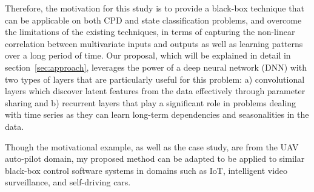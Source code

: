 Therefore, the motivation for this study is to provide a black-box technique that can be applicable on both CPD and state classification problems, and overcome the limitations of the existing techniques, in terms of capturing the non-linear correlation between multivariate inputs and outputs as well as learning patterns over a long period of time. Our proposal, which will be explained in detail in section~\ref{sec:approach}, leverages the power of a deep neural network (DNN) with two types of layers that are particularly useful for this problem: a) convolutional layers which discover latent features from the data effectively through parameter sharing and b) recurrent layers that play a significant role in problems dealing with time series as they can learn long-term dependencies and seasonalities in the data. 

Though the motivational example, as well as the case study, are from the UAV auto-pilot domain, my proposed method can be adapted to be applied to similar black-box control software systems in domains such as IoT, intelligent video surveillance, and self-driving cars.